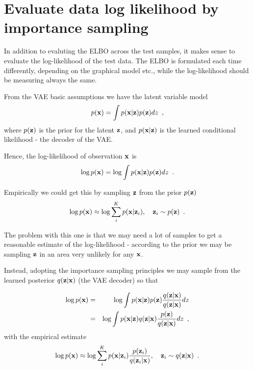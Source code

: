 
\clearpage

\section{Evaluate data log likelihood by importance sampling}

In addition to evaluting the ELBO across the test samples, it makes sense to evaluate the log-likelihood of the test data. The ELBO is formulated each time differently, depending on the graphical model etc., while the log-likelihood should be measuring always the same.

From the VAE basic assumptions we have the latent variable model
\begin{equation}
p(\mathbf{x}) = \int p(\mathbf{x} | \mathbf{z}) p(\mathbf{z}) dz \enspace , 
\end{equation}
where $p(\mathbf{z})$ is the prior for the latent $\mathbf{z}$, and $p(\mathbf{x} | \mathbf{z})$ is the learned conditional likelihood - the decoder of the VAE.

Hence, the log-likelihood of observation $\mathbf{x}$ is 
\begin{equation}
\log p(\mathbf{x}) = \log \int p(\mathbf{x} | \mathbf{z}) p(\mathbf{z}) dz \enspace . 
\end{equation}

Empirically we could get this by sampling $\mathbf{z}$ from the prior $p(\mathbf{z})$
\begin{equation}
\log p(\mathbf{x}) \approx \log \sum_i^K p(\mathbf{x} | \mathbf{z}_i), \quad \mathbf{z}_i \sim p(\mathbf{z})  \enspace . 
\end{equation}

The problem with this one is that we may need a lot of samples to get a reasonable estimate of the log-likelihood - according to the prior we may be sampling $\mathbf{z}$ in an area very unlikely for any $\mathbf{x}$.

Instead, adopting the importance sampling principles we may sample from the learned posterior $q(\mathbf{z}|\mathbf{x})$ (the VAE decoder) so that

\begin{eqnarray}
\log p(\mathbf{x}) & = & \log \int p(\mathbf{x} | \mathbf{z}) p(\mathbf{z}) \frac{q(\mathbf{z} | \mathbf{x})}{q(\mathbf{z} | \mathbf{x})} dz  \nonumber \\
& = & \log \int p(\mathbf{x} | \mathbf{z}) q(\mathbf{z} | \mathbf{x}) \frac{p(\mathbf{z}) }{q(\mathbf{z} | \mathbf{x})} dz  
\enspace ,
\end{eqnarray}
with the empirical estimate
\begin{equation}
\log p(\mathbf{x}) \approx \log \sum_i^K p(\mathbf{x} | \mathbf{z}_i) \frac{p(\mathbf{z}_i) }{q(\mathbf{z}_i| \mathbf{x})}, \quad \mathbf{z}_i \sim q(\mathbf{z}| \mathbf{x})  \enspace . 
\end{equation}

